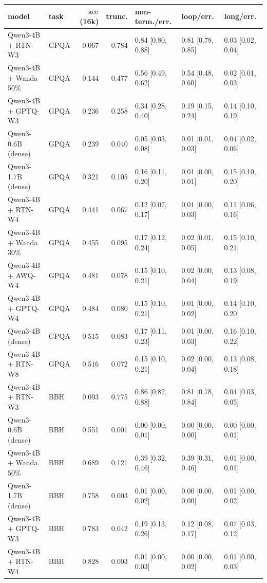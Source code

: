 \begin{tabular}{llrrlll}
\toprule
model & task & $\mathrm{acc}$ (16k) & trunc. & non-term./err. & loop/err. & long/err. \\
\midrule
Qwen3-4B + RTN-W3 & GPQA & 0.067 & 0.784 & 0.84 [0.80, 0.88] & 0.81 [0.78, 0.85] & 0.03 [0.02, 0.04] \\
Qwen3-4B + Wanda 50\% & GPQA & 0.144 & 0.477 & 0.56 [0.49, 0.62] & 0.54 [0.48, 0.60] & 0.02 [0.01, 0.03] \\
Qwen3-4B + GPTQ-W3 & GPQA & 0.236 & 0.258 & 0.34 [0.28, 0.40] & 0.19 [0.15, 0.24] & 0.14 [0.10, 0.19] \\
Qwen3-0.6B (dense) & GPQA & 0.239 & 0.040 & 0.05 [0.03, 0.08] & 0.01 [0.01, 0.03] & 0.04 [0.02, 0.06] \\
Qwen3-1.7B (dense) & GPQA & 0.321 & 0.105 & 0.16 [0.11, 0.20] & 0.01 [0.00, 0.01] & 0.15 [0.10, 0.20] \\
Qwen3-4B + RTN-W4 & GPQA & 0.441 & 0.067 & 0.12 [0.07, 0.17] & 0.01 [0.00, 0.03] & 0.11 [0.06, 0.16] \\
Qwen3-4B + Wanda 30\% & GPQA & 0.455 & 0.095 & 0.17 [0.12, 0.24] & 0.02 [0.01, 0.05] & 0.15 [0.10, 0.21] \\
Qwen3-4B + AWQ-W4 & GPQA & 0.481 & 0.078 & 0.15 [0.10, 0.21] & 0.02 [0.00, 0.04] & 0.13 [0.08, 0.19] \\
Qwen3-4B + GPTQ-W4 & GPQA & 0.484 & 0.080 & 0.15 [0.10, 0.21] & 0.01 [0.00, 0.02] & 0.14 [0.10, 0.20] \\
Qwen3-4B (dense) & GPQA & 0.515 & 0.083 & 0.17 [0.11, 0.23] & 0.01 [0.00, 0.03] & 0.16 [0.10, 0.22] \\
Qwen3-4B + RTN-W8 & GPQA & 0.516 & 0.072 & 0.15 [0.10, 0.21] & 0.02 [0.00, 0.04] & 0.13 [0.08, 0.18] \\
Qwen3-4B + RTN-W3 & BBH & 0.093 & 0.775 & 0.86 [0.82, 0.88] & 0.81 [0.78, 0.84] & 0.04 [0.03, 0.05] \\
Qwen3-0.6B (dense) & BBH & 0.551 & 0.001 & 0.00 [0.00, 0.01] & 0.00 [0.00, 0.00] & 0.00 [0.00, 0.01] \\
Qwen3-4B + Wanda 50\% & BBH & 0.689 & 0.121 & 0.39 [0.32, 0.46] & 0.39 [0.31, 0.46] & 0.01 [0.00, 0.01] \\
Qwen3-1.7B (dense) & BBH & 0.758 & 0.003 & 0.01 [0.00, 0.02] & 0.00 [0.00, 0.00] & 0.01 [0.00, 0.02] \\
Qwen3-4B + GPTQ-W3 & BBH & 0.783 & 0.042 & 0.19 [0.13, 0.26] & 0.12 [0.08, 0.17] & 0.07 [0.03, 0.12] \\
Qwen3-4B + RTN-W4 & BBH & 0.828 & 0.003 & 0.01 [0.00, 0.03] & 0.00 [0.00, 0.02] & 0.01 [0.00, 0.03] \\

\end{tabular}
